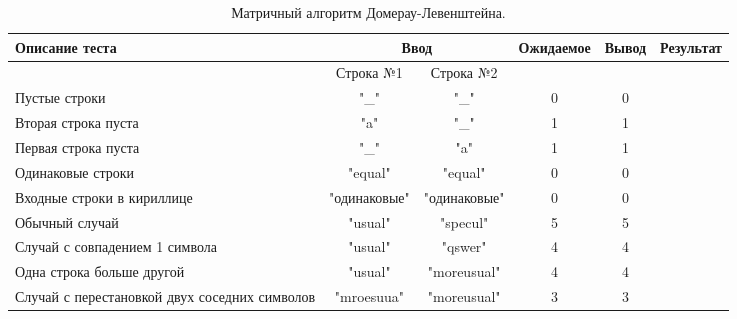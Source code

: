 \documentclass[12pt]{report}
\begin{document}
\begin{table}
	\caption{\label{tab:test3} Матричный алгоритм Домерау-Левенштейна.}
	\begin{center}
		\begin{tabular}{|p{2.5cm}|c|c|c|c|c|}
			\hline
			Описание теста & \multicolumn{2}{|c|}{Ввод} & Ожидаемое & Вывод & Результат\\
			\hline
			& Строка №1 & Строка №2 & & & \\
			\hline
			Пустые строки & "\_" & "\_" & 0 & 0 & \checkmark\\
			\hline
			Вторая строка пуста & "a" & "\_" & 1 & 1 & \checkmark\\
			\hline
			Первая строка пуста & "\_" & "a" & 1 & 1 & \checkmark\\
			\hline
			Одинаковые строки & "equal" & "equal" & 0 & 0 & \checkmark\\
			\hline
			Входные строки в кириллице & "одинаковые" & "одинаковые" & 0 & 0 & \checkmark\\
			\hline
			Обычный случай & "usual" & "specul" & 5 & 5 & \checkmark\\
			\hline
			Случай с совпадением 1 символа & "usual" & "qswer" & 4 & 4 & \checkmark\\
			\hline
			Одна строка больше другой & "usual" & "moreusual" & 4 & 4 & \checkmark\\
			\hline
			Случай с перестановкой двух соседних символов & "mroesuua" & "moreusual" & 3 & 3 & \checkmark\\
			\hline
		\end{tabular}
	\end{center}
\end{table}

\newpage
\end{document}
